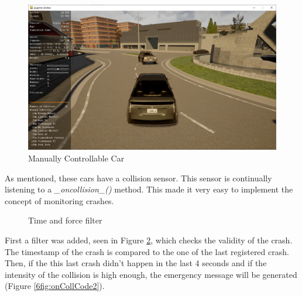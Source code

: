 \begin{figure}[H]
  \centering\includegraphics[width=0.9\linewidth]{chapters/chapter6_bruno/Figures/manual1.png}
  \caption{Manually Controllable Car}
  \label{6fig:manCar}
\end{figure}

\noindent
As mentioned, these cars have a collision sensor.
This sensor is continually listening to a \emph{\_oncollision\_()} method. 
This made it very easy to implement the concept of monitoring crashes.

\begin{figure}
    \vspace{-16pt}
    \vspace{-16pt}
  \caption{Time and force filter}
  \label{6fig:onCollCode}
    \vspace{-18pt}
\end{figure}

\noindent
First a filter was added, seen in Figure \ref{6fig:onCollCode},
which checks the validity of the crash.
The timestamp of the crash is compared to the one of the last registered crash.
Then, if the this last crash didn't happen in the last 4 seconds
and if the intensity of the collision is high enough,
the emergency message will be generated (Figure \ref{6fig:onCollCode2}).

